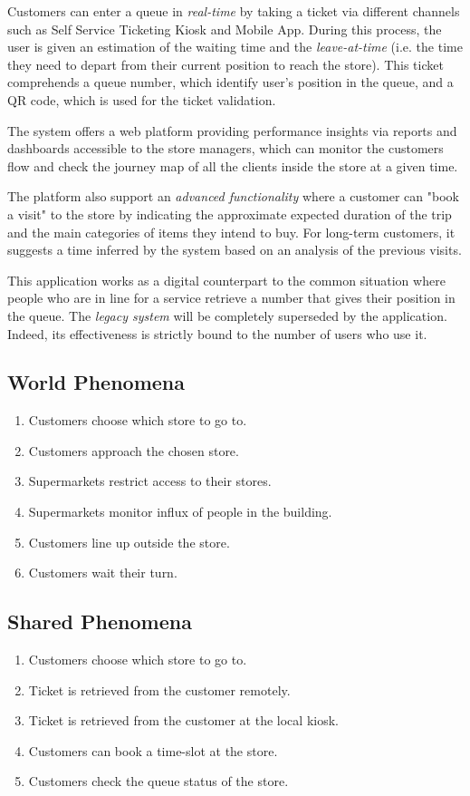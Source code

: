 Customers can enter a queue in \textit{real-time} by taking a ticket via different channels such as Self Service Ticketing Kiosk and Mobile App. During this process, the user is given an estimation of the waiting time and the \textit{leave-at-time} (i.e. the time they need to depart from their current position to reach the store). This ticket comprehends a queue number, which identify user's position in the queue, and a QR code, which is used for the ticket validation.

The system offers a web platform providing performance insights via reports and dashboards accessible to the store managers, which can monitor the customers flow and check the journey map of all the clients inside the store at a given time.

The platform also support an \textit{advanced functionality} where a customer can "book a visit" to the store by indicating the approximate expected duration of the trip and the main categories of items they intend to buy. For long-term customers, it suggests a time inferred by the system based on an analysis of the previous visits.

This application works as a digital counterpart to the common situation where people who are in line for a service retrieve a number that gives their position in the queue. The \textit{legacy system} will be completely superseded by the application. Indeed, its effectiveness is strictly bound to the number of users who use it.

\subsection{World Phenomena}
\begin{enumerate}[label=\textbf{WP.\arabic*}]
	\item Customers choose which store to go to.
	\item Customers approach the chosen store.
	\item Supermarkets restrict access to their stores.
	\item Supermarkets monitor influx of people in the building.
	\item Customers line up outside the store.
	\item Customers wait their turn.
\end{enumerate}

\subsection{Shared Phenomena}
\begin{enumerate}[label=\textbf{SP.\arabic*}]
	\item Customers choose which store to go to.
	\item Ticket is retrieved from the customer remotely.
	\item Ticket is retrieved from the customer at the local kiosk.
	\item Customers can book a time-slot at the store.
	\item Customers check the queue status of the store.
\end{enumerate}

